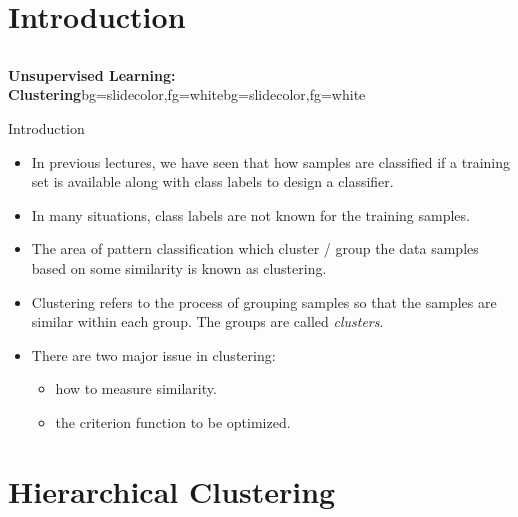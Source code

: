 \section{Introduction}
\subsection{}
\begin{frame}{}
\begin{variableblock}{\centering \Large \textbf{\vspace{4pt}\newline Unsupervised Learning: Clustering\vspace{4pt}}}{bg=slidecolor,fg=white}{bg=slidecolor,fg=white}
\end{variableblock}
\end{frame}

\begin{frame}{Introduction}
\begin{itemize}
\item In previous lectures, we have seen that how samples are classified if a training set is available along with class labels to design a classifier.
\item In many situations, class labels are not known for the training samples.
\item The area of pattern classification which {\color{mycolor1}cluster / group the data samples} based on some {\color{mycolor1}similarity} is known as {\color{mycolor2}clustering}.
\item Clustering refers to the process of grouping samples so that the samples are similar within each group. The groups are called \textit{\color{mycolor2}clusters}.
\item There are two major issue in clustering:
\begin{itemize}
\item how to measure {\color{mycolor2}similarity}.
\item the criterion function to be optimized.
\end{itemize}
\end{itemize}
\end{frame}

\section{Hierarchical Clustering}

